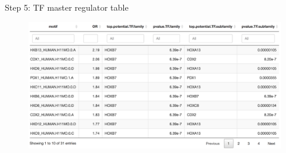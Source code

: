 \documentclass[slidestop,compress,11pt,xcolor=dvipsnames]{beamer}
\begin{document}

\begin{frame}{Step 5: TF master regulator table}
 \begin{figure}
  \centering
  \includegraphics[width=1.0\linewidth]{ELMER/TF_tbl.png}
 \end{figure}
\end{frame}
\end{document}
